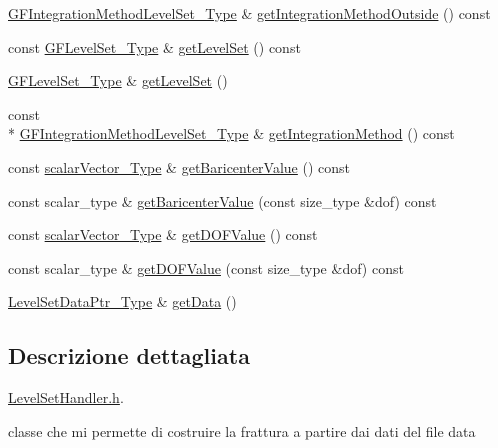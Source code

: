 \begin{DoxyCompactItemize}
\hyperlink{Core_8h_ade18ba6e17965b6fdd50b3382b2a7020}{G\-F\-Integration\-Method\-Level\-Set\-\_\-\-Type} \& \hyperlink{classLevelSetHandler_a155cedf651006dc5509c34a6ea5e3324}{get\-Integration\-Method\-Outside} () const 
\item 
const \hyperlink{Core_8h_a71358a15bd3925629e26ccbb214a0133}{G\-F\-Level\-Set\-\_\-\-Type} \& \hyperlink{classLevelSetHandler_aa899ffbee62631067378346d61fd172a}{get\-Level\-Set} () const 
\item 
\hyperlink{Core_8h_a71358a15bd3925629e26ccbb214a0133}{G\-F\-Level\-Set\-\_\-\-Type} \& \hyperlink{classLevelSetHandler_a88f16d61da1d2a2a68d5ef33fa77a41d}{get\-Level\-Set} ()
\item 
const \\*
\hyperlink{Core_8h_ade18ba6e17965b6fdd50b3382b2a7020}{G\-F\-Integration\-Method\-Level\-Set\-\_\-\-Type} \& \hyperlink{classLevelSetHandler_ad35aef3284c2582550b376fd3e99c45f}{get\-Integration\-Method} () const 
\item 
const \hyperlink{Core_8h_a4e75b5863535ba1dd79942de2846eff0}{scalar\-Vector\-\_\-\-Type} \& \hyperlink{classLevelSetHandler_a983463087a38199510a0859658ad5291}{get\-Baricenter\-Value} () const 
\item 
const scalar\-\_\-type \& \hyperlink{classLevelSetHandler_a7a4653958485195d2b995be4d52e2765}{get\-Baricenter\-Value} (const size\-\_\-type \&dof) const 
\item 
const \hyperlink{Core_8h_a4e75b5863535ba1dd79942de2846eff0}{scalar\-Vector\-\_\-\-Type} \& \hyperlink{classLevelSetHandler_ac46f075503657b1481d80acb5d3307d1}{get\-D\-O\-F\-Value} () const 
\item 
const scalar\-\_\-type \& \hyperlink{classLevelSetHandler_ab9babfc6e7705047b005a88b4ab1f46f}{get\-D\-O\-F\-Value} (const size\-\_\-type \&dof) const 
\item 
\hyperlink{LevelSetData_8h_a7750f14ec1c622b3c69aa0c5c2894972}{Level\-Set\-Data\-Ptr\-\_\-\-Type} \& \hyperlink{classLevelSetHandler_ab24897cb969210d278f54d94fd8f8977}{get\-Data} ()
\end{DoxyCompactItemize}


\subsection{Descrizione dettagliata}
\hyperlink{LevelSetHandler_8h}{Level\-Set\-Handler.\-h}. 

classe che mi permette di costruire la frattura a partire dai dati del file data 

